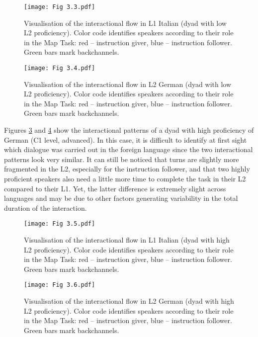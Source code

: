  

\begin{figure}
\texttt{[image: Fig 3.3.pdf]}
\caption{Visualisation of the interactional flow in L1 Italian (dyad with low L2 proficiency). Color code identifies speakers according to their role in the Map Task: red – instruction giver, blue – instruction follower. Green bars mark backchannels.}
\label{fig:3.3}
\end{figure}


\begin{figure}
\texttt{[image: Fig 3.4.pdf]}
\caption{Visualisation of the interactional flow in L2 German (dyad with low L2 proficiency). Color code identifies speakers according to their role in the Map Task: red – instruction giver, blue – instruction follower. Green bars mark backchannels.}
\label{fig:3.4}
\end{figure}

Figures \ref{fig:3.5} and \ref{fig:3.6} show the interactional patterns of a dyad with high proficiency of German (C1 level, advanced). In this case, it is difficult to identify at first sight which dialogue was carried out in the foreign language since the two interactional patterns look very similar. It can still be noticed that turns are slightly more fragmented in the L2, especially for the instruction follower, and that two highly proficient speakers also need a little more time to complete the task in their L2 compared to their L1. Yet, the latter difference is extremely slight across languages and may be due to other factors generating variability in the total duration of the interaction.

\begin{figure}
\texttt{[image: Fig 3.5.pdf]}
\caption{Visualisation of the interactional flow in L1 Italian (dyad with high L2 proficiency). Color code identifies speakers according to their role in the Map Task: red – instruction giver, blue – instruction follower. Green bars mark backchannels.}
\label{fig:3.5}
\end{figure}


\begin{figure}
\texttt{[image: Fig 3.6.pdf]}
\caption{Visualisation of the interactional flow in L2 German (dyad with high L2 proficiency). Color code identifies speakers according to their role in the Map Task: red – instruction giver, blue – instruction follower. Green bars mark backchannels.}
\label{fig:3.6}
\end{figure}

